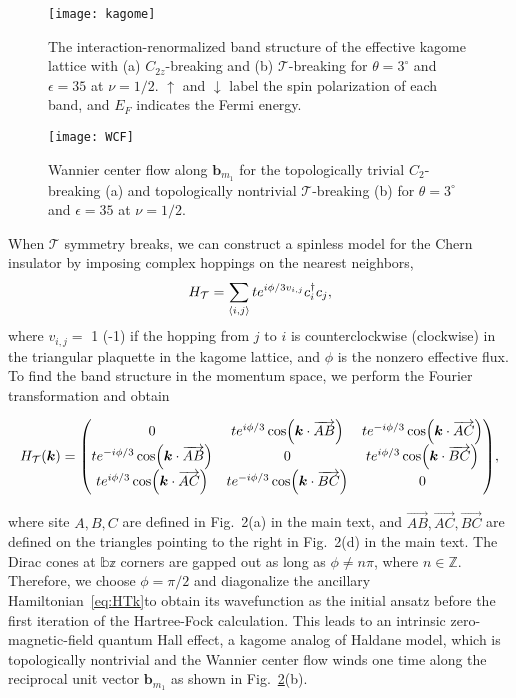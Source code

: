 \documentclass[aps,prl,floatfix,twocolumn]{revtex4-1}
\begin{document}
\begin{figure}[t]
	\centering
	\texttt{[image: kagome]}
	\caption{The interaction-renormalized band structure of the effective kagome lattice with (a) $ C_{2z} $-breaking and (b) $ \mathcal{T} $-breaking for $ \theta=3^\circ $ and $ \epsilon=35 $ at $ \nu=1/2 $. $\uparrow$ and $\downarrow$ label the spin polarization of each band, and $E_F$ indicates the Fermi energy.}
	\label{fig:kagome}
\end{figure}
\begin{figure}[t]
	\centering
	\texttt{[image: WCF]}
	\caption{Wannier center flow along $ \bm{b}_{m_1} $ for the topologically trivial $ C_2 $-breaking (a) and topologically nontrivial $ \mathcal{T} $-breaking (b) for $ \theta=3^\circ $ and $ \epsilon=35 $ at $ \nu=1/2 $.}
	\label{fig:WCF}
\end{figure}


When $ \mathcal{T} $ symmetry breaks, we can construct a spinless model for the Chern insulator by imposing complex hoppings on the nearest neighbors,
\begin{equation}\label{eq:HT}
	H_{\mathcal{T}}=\sum_{\expval{i,j}} t e^{i\phi/3 v_{i,j}} c_i^\dagger c_j,
\end{equation}
where $ v_{i,j}= $ 1 (-1) if the hopping from $ j $ to $ i $ is counterclockwise (clockwise) in the triangular plaquette in the kagome lattice, and $ \phi $ is the nonzero effective flux. To find the band structure in the momentum space, we perform the Fourier transformation and obtain
\begin{widetext}
	\begin{equation}\label{eq:HTk}
		H_{\mathcal{T}}(\bm{k})=\mqty(0 & t e^{i\phi/3}\cos(\bm{k}\cdot\overrightarrow{AB}) & t e^{-i\phi/3}\cos(\bm{k}\cdot\overrightarrow{AC})\\
		t e^{-i\phi/3}\cos(\bm{k}\cdot\overrightarrow{AB}) & 0 & t e^{i\phi/3}\cos(\bm{k}\cdot\overrightarrow{BC})\\
		t e^{i\phi/3}\cos(\bm{k}\cdot\overrightarrow{AC}) & t e^{-i\phi/3}\cos(\bm{k}\cdot\overrightarrow{BC}) & 0
		),
	\end{equation}
\end{widetext}

where site $ A,B,C $ are defined in Fig.~2(a) in the main text, and $ \overrightarrow{AB},\overrightarrow{AC},\overrightarrow{BC} $ are defined on the triangles pointing to the right in Fig.~2(d) in the main text. The Dirac cones at $ \mathbb{bz} $ corners are gapped out as long as $ \phi\neq n\pi $, where $ n\in\mathbb{Z} $. Therefore, we choose $ \phi=\pi/2 $ and diagonalize the ancillary Hamiltonian~\eqref{eq:HTk}to obtain its wavefunction as the initial ansatz before the first iteration of the Hartree-Fock calculation. This leads to an intrinsic zero-magnetic-field quantum Hall effect, a kagome analog of Haldane model, which is topologically nontrivial and the Wannier center flow winds one time along the reciprocal unit vector $ \bm{b}_{m_1} $ as shown in Fig.~\ref{fig:WCF}(b). 
\end{document}
